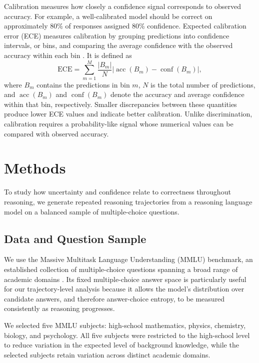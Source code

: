 \documentclass{article}
\begin{document}
Calibration measures how closely a confidence signal corresponds to observed accuracy. For example, a well-calibrated model should be correct on approximately 80\% of responses assigned 80\% confidence. Expected calibration error (ECE) measures calibration by grouping predictions into confidence intervals, or bins, and comparing the average confidence with the observed accuracy within each bin \cite{guo2017calibration}. It is defined as
\begin{equation}
\mathrm{ECE}
=
\sum_{m=1}^{M}
\frac{|B_m|}{N}
\left|
\operatorname{acc}(B_m) - \operatorname{conf}(B_m)
\right|,
\end{equation}
where $B_m$ contains the predictions in bin $m$, $N$ is the total number of predictions, and $\operatorname{acc}(B_m)$ and $\operatorname{conf}(B_m)$ denote the accuracy and average confidence within that bin, respectively. Smaller discrepancies between these quantities produce lower ECE values and indicate better calibration. Unlike discrimination, calibration requires a probability-like signal whose numerical values can be compared with observed accuracy.


\section{Methods}
\label{sec:methods}

To study how uncertainty and confidence relate to correctness throughout reasoning, we generate repeated reasoning trajectories from a reasoning language model on a balanced sample of multiple-choice questions.

\subsection{Data and Question Sample}

We use the Massive Multitask Language Understanding (MMLU) benchmark, an established collection of multiple-choice questions spanning a broad range of academic domains \cite{hendrycks2021mmlu}. Its fixed multiple-choice answer space is particularly useful for our trajectory-level analysis because it allows the model's distribution over candidate answers, and therefore answer-choice entropy, to be measured consistently as reasoning progresses.


We selected five MMLU subjects: high-school mathematics, physics, chemistry, biology, and psychology. All five subjects were restricted to the high-school level to reduce variation in the expected level of background knowledge, while the selected subjects retain variation across distinct academic domains.
\end{document}
